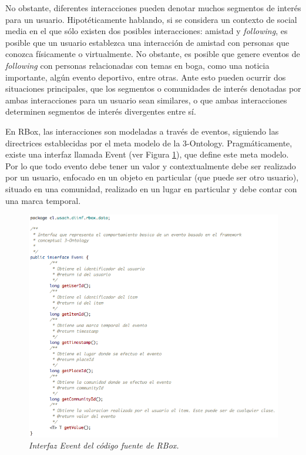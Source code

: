 No obstante, diferentes interacciones pueden denotar muchos segmentos de interés para un usuario. Hipotéticamente hablando, si se considera un contexto de social media en el que sólo existen dos posibles interacciones: amistad y \textit{following}, es posible que un usuario establezca una interacción de amistad con personas que conozca físicamente o virtualmente. No obstante, es posible que genere eventos de \textit{following} con personas relacionadas con temas en boga, como una noticia importante, algún evento deportivo, entre otras. Ante esto pueden ocurrir dos situaciones principales, que los segmentos o comunidades de interés denotadas por ambas interacciones para un usuario sean similares, o que ambas interacciones determinen segmentos de interés divergentes entre sí.

En RBox, las interacciones son modeladas a través de eventos, siguiendo las directrices establecidas por el meta modelo de la 3-Ontology. Pragmáticamente, existe una interfaz llamada Event (ver Figura \ref{fig:vis-im1}), que define este meta modelo. Por lo que todo evento debe tener un valor y contextualmente debe ser realizado por un usuario, enfocado en un objeto en particular (que puede ser otro usuario), situado en una comunidad, realizado en un lugar en particular y debe contar con una marca temporal. 

\begin{figure}
  \centering
  \includegraphics[scale=.5]{images/Figura7-1}
  \caption{\em Interfaz Event del código fuente de RBox.}
  \label{fig:vis-im1}
\end{figure}

